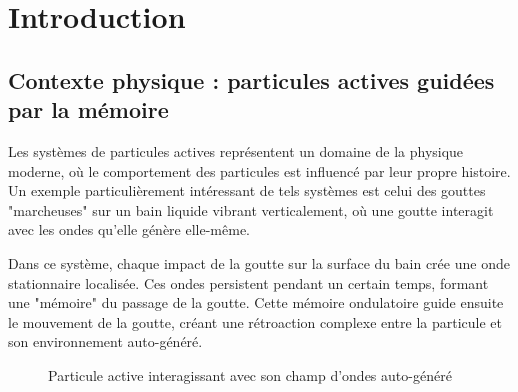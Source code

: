 \section{Introduction}

\subsection{Contexte physique : particules actives guidées par la mémoire}
Les systèmes de particules actives représentent un domaine de la physique moderne, où le comportement des particules est influencé par leur propre histoire. Un exemple particulièrement intéressant de tels systèmes est celui des gouttes "marcheuses" sur un bain liquide vibrant verticalement, où une goutte interagit avec les ondes qu'elle génère elle-même.

Dans ce système, chaque impact de la goutte sur la surface du bain crée une onde stationnaire localisée. Ces ondes persistent pendant un certain temps, formant une "mémoire" du passage de la goutte. Cette mémoire ondulatoire guide ensuite le mouvement de la goutte, créant une rétroaction complexe entre la particule et son environnement auto-généré.

\begin{figure}[h]
    \centering
    \caption{Particule active interagissant avec son champ d'ondes auto-généré}
    \label{fig:schema_particule}
\end{figure}


